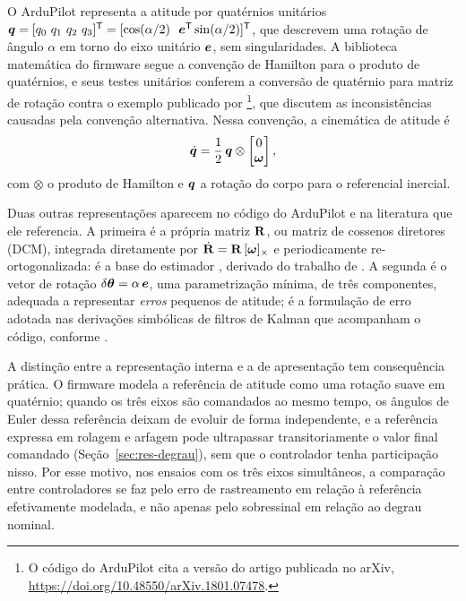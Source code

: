 O ArduPilot representa a atitude por quatérnios unitários
$\vetor{q} = [q_0\ q_1\ q_2\ q_3]^{\mathsf{T}} =
[\cos(\alpha/2)\ \ \vetor{e}^{\mathsf{T}}\sin(\alpha/2)]^{\mathsf{T}}$, que
descrevem uma rotação de ângulo $\alpha$ em torno do eixo unitário
$\bm{e}$, sem singularidades. A biblioteca matemática do firmware segue a
convenção de Hamilton para o produto de quatérnios, e seus testes unitários
conferem a conversão de quatérnio para matriz de rotação contra o exemplo
publicado por \footnote{O código do ArduPilot cita a
versão do artigo publicada no arXiv,
\url{https://doi.org/10.48550/arXiv.1801.07478}.}, que discutem as
inconsistências causadas pela convenção alternativa. Nessa convenção, a
cinemática de atitude é~\cite{sola2017,hager2026}
\begin{equation}
\dot{\bm{q}} = \frac{1}{2}\,\bm{q} \otimes
\begin{bmatrix} 0 \\ \bm{\omega} \end{bmatrix},
\label{eq:cinematica-quaternio}
\end{equation}
com $\otimes$ o produto de Hamilton e $\bm{q}$ a rotação do corpo para o
referencial inercial.

Duas outras representações aparecem no código do ArduPilot e na literatura
que ele referencia. A primeira é a própria matriz $\mathbf{R}$, ou matriz de
cossenos diretores (DCM), integrada diretamente por
$\dot{\mathbf{R}} = \mathbf{R}\,[\bm{\omega}]_\times$ e periodicamente
re-ortogonalizada: é a base do estimador , derivado do
trabalho de . A segunda é o vetor de rotação
$\delta\bm{\theta} = \alpha\,\bm{e}$, uma parametrização mínima, de três
componentes, adequada a representar \emph{erros} pequenos de atitude; é a
formulação de erro adotada nas derivações simbólicas de filtros de Kalman que
acompanham o código, conforme .

A distinção entre a representação interna e a de apresentação tem
consequência prática. O firmware modela a referência de atitude como uma
rotação suave em quatérnio; quando os três eixos são comandados ao mesmo
tempo, os ângulos de Euler dessa referência deixam de evoluir de forma
independente, e a referência expressa em rolagem e arfagem pode ultrapassar
transitoriamente o valor final comandado (Seção~\ref{sec:res-degrau}), sem
que o controlador tenha participação nisso. Por esse motivo, nos ensaios com os três eixos
simultâneos, a comparação entre controladores se faz pelo erro de
rastreamento em relação à referência efetivamente modelada, e não apenas pelo
sobressinal em relação ao degrau nominal.


